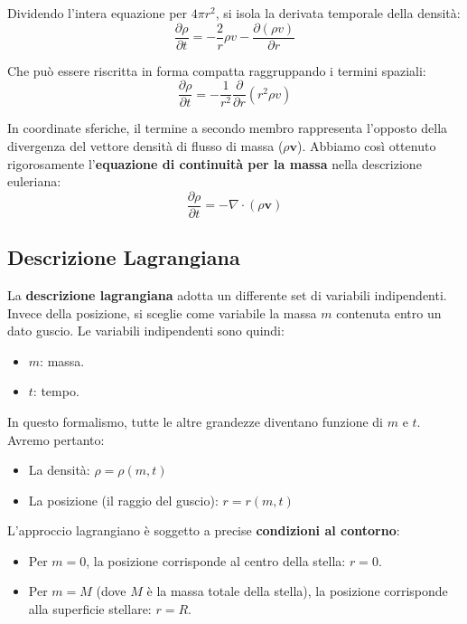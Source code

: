 Dividendo l'intera equazione per $4\pi r^2$, si isola la derivata temporale della densità:
\begin{equation}
\frac{\partial \rho}{\partial t} = -\frac{2}{r} \rho v - \frac{\partial (\rho v)}{\partial r}
\end{equation}

Che può essere riscritta in forma compatta raggruppando i termini spaziali:
\begin{equation}
\frac{\partial \rho}{\partial t} = -\frac{1}{r^2} \frac{\partial}{\partial r} (r^2 \rho v)
\end{equation}

In coordinate sferiche, il termine a secondo membro rappresenta l'opposto della divergenza del vettore densità di flusso di massa ($\rho \mathbf{v}$). Abbiamo così ottenuto rigorosamente l'\textbf{equazione di continuità per la massa} nella descrizione euleriana:
\begin{equation}
\frac{\partial \rho}{\partial t} = -\nabla \cdot (\rho \mathbf{v})
\end{equation}

\subsection{Descrizione Lagrangiana}

La \textbf{descrizione lagrangiana} adotta un differente set di variabili indipendenti. Invece della posizione, si sceglie come variabile la massa $m$ contenuta entro un dato guscio.
Le variabili indipendenti sono quindi:
\begin{itemize}
\item $m$: massa.
\item $t$: tempo.
\end{itemize}

In questo formalismo, tutte le altre grandezze diventano funzione di $m$ e $t$. Avremo pertanto:
\begin{itemize}
\item La densità: $\rho = \rho(m,t)$
\item La posizione (il raggio del guscio): $r = r(m,t)$
\end{itemize}

L'approccio lagrangiano è soggetto a precise \textbf{condizioni al contorno}:
\begin{itemize}
\item Per $m = 0$, la posizione corrisponde al centro della stella: $r = 0$.
\item Per $m = M$ (dove $M$ è la massa totale della stella), la posizione corrisponde alla superficie stellare: $r = R$.
\end{itemize}

